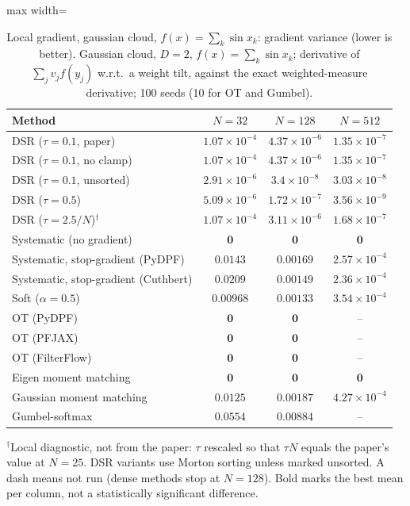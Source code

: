\begin{table}[H]
\centering
\small
\caption{Local gradient, gaussian cloud, $f(x)=\sum_k\sin x_k$: gradient variance (lower is better). Gaussian cloud, $D{=}2$, $f(x)=\sum_k\sin x_k$; derivative of $\sum_j v_j f(y_j)$ w.r.t.\ a weight tilt, against the exact weighted-measure derivative; 100 seeds (10 for OT and Gumbel).}
\label{tab:grad-gaussian-sin-gradient_variance}
\begin{adjustbox}{max width=\linewidth}
\begin{tabular}{lccc}
\toprule
Method & $N{=}32$ & $N{=}128$ & $N{=}512$ \\
\midrule
DSR ($\tau{=}0.1$, paper) & $1.07\times10^{-4}$ & $4.37\times10^{-6}$ & $1.35\times10^{-7}$ \\
DSR ($\tau{=}0.1$, no clamp) & $1.07\times10^{-4}$ & $4.37\times10^{-6}$ & $1.35\times10^{-7}$ \\
DSR ($\tau{=}0.1$, unsorted) & $2.91\times10^{-6}$ & $3.4\times10^{-8}$ & $3.03\times10^{-8}$ \\
DSR ($\tau{=}0.5$) & $5.09\times10^{-6}$ & $1.72\times10^{-7}$ & $3.56\times10^{-9}$ \\
DSR ($\tau{=}2.5/N$)$^\dagger$ & $1.07\times10^{-4}$ & $3.11\times10^{-6}$ & $1.68\times10^{-7}$ \\
\midrule
Systematic (no gradient) & $\mathbf{0}$ & $\mathbf{0}$ & $\mathbf{0}$ \\
Systematic, stop-gradient (PyDPF) & $0.0143$ & $0.00169$ & $2.57\times10^{-4}$ \\
Systematic, stop-gradient (Cuthbert) & $0.0209$ & $0.00149$ & $2.36\times10^{-4}$ \\
Soft ($\alpha{=}0.5$) & $0.00968$ & $0.00133$ & $3.54\times10^{-4}$ \\
OT (PyDPF) & $\mathbf{0}$ & $\mathbf{0}$ & -- \\
OT (PFJAX) & $\mathbf{0}$ & $\mathbf{0}$ & -- \\
OT (FilterFlow) & $\mathbf{0}$ & $\mathbf{0}$ & -- \\
Eigen moment matching & $\mathbf{0}$ & $\mathbf{0}$ & $\mathbf{0}$ \\
Gaussian moment matching & $0.0125$ & $0.00187$ & $4.27\times10^{-4}$ \\
Gumbel-softmax & $0.0554$ & $0.00884$ & -- \\
\bottomrule
\end{tabular}
\end{adjustbox}
\par\smallskip\parbox{0.95\linewidth}{\footnotesize $^\dagger$Local diagnostic, not from the paper: $\tau$ rescaled so that $\tau N$ equals the paper's value at $N{=}25$. DSR variants use Morton sorting unless marked unsorted. A dash means not run (dense methods stop at $N{=}128$). Bold marks the best mean per column, not a statistically significant difference.}
\end{table}

